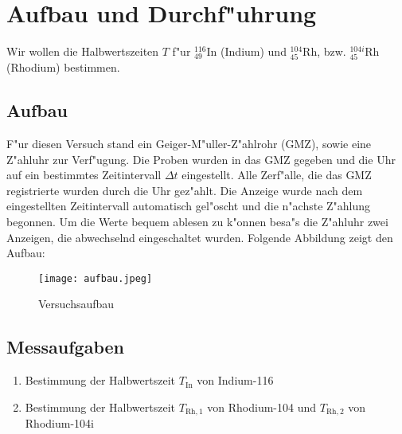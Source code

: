 \section{Aufbau und Durchf"uhrung}
	\label{sec:durchfuehrung}

	Wir wollen die Halbwertszeiten $T$ f"ur ${}_{49}^{116}\mathrm{In}$ (Indium) und ${}_{45}^{104}\mathrm{Rh}$, bzw. ${}_{45}^{104i}\mathrm{Rh}$ (Rhodium) bestimmen.

	\subsection{Aufbau}
		\label{subsec:aufbau}
		F"ur diesen Versuch stand ein Geiger-M"uller-Z"ahlrohr (GMZ), sowie eine Z"ahluhr zur Verf"ugung.
		Die Proben wurden in das GMZ gegeben und die Uhr auf ein bestimmtes Zeitintervall $\Delta t$ eingestellt.
		Alle Zerf"alle, die das GMZ registrierte wurden durch die Uhr gez"ahlt.
		Die Anzeige wurde nach dem eingestellten Zeitintervall automatisch gel"oscht und die n"achste Z"ahlung begonnen.
		Um die Werte bequem ablesen zu k"onnen besa"s die Z"ahluhr zwei Anzeigen, die abwechselnd eingeschaltet wurden.
		Folgende Abbildung zeigt den Aufbau:

		\begin{figure}[h]
			\centering
			\texttt{[image: aufbau.jpeg]}
			\caption{Versuchsaufbau}
			\label{fig:aufbau}
		\end{figure}

	\subsection{Messaufgaben}
		\label{subsec:aufgaben}
		\begin{enumerate}
			\item{Bestimmung der Halbwertszeit $T_\mathrm{In}$ von Indium-116}
			\item{Bestimmung der Halbwertszeit $T_{\mathrm{Rh}, 1}$ von Rhodium-104 und $T_{\mathrm{Rh}, 2}$ von Rhodium-104i}
		\end{enumerate}
